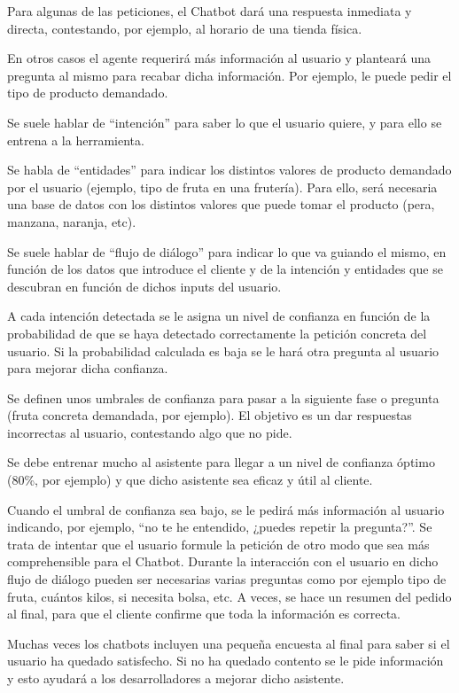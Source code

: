 Para algunas de las peticiones, el Chatbot dará una respuesta inmediata y directa, contestando, por ejemplo, al horario de una tienda física.

En otros casos el agente requerirá más información al usuario y planteará una pregunta al mismo para recabar dicha información. Por ejemplo, le puede pedir el tipo de producto demandado.

Se suele hablar de “intención” para saber lo que el usuario quiere, y para ello se entrena a la herramienta.

Se habla de “entidades” para indicar los distintos valores de producto demandado por el usuario (ejemplo, tipo de fruta en una frutería). Para ello, será necesaria una base de datos con los distintos valores que puede tomar el producto (pera, manzana, naranja, etc).

Se suele hablar de “flujo de diálogo” para indicar lo que va guiando el mismo, en función de los datos que introduce el cliente y de la intención y entidades que se descubran en función de dichos inputs del usuario.

A cada intención detectada se le asigna un nivel de confianza en función de la probabilidad de que se haya detectado correctamente la petición concreta del usuario. Si la probabilidad calculada es baja se le hará otra pregunta al usuario para mejorar dicha confianza.

Se definen unos umbrales de confianza para pasar a la siguiente fase o pregunta (fruta concreta demandada, por ejemplo). El objetivo es un dar respuestas incorrectas al usuario, contestando algo que no pide. 

Se debe entrenar mucho al asistente para llegar a un nivel de confianza óptimo (80\%, por ejemplo) y que dicho asistente sea eficaz y útil al cliente.

Cuando el umbral de confianza sea bajo, se le pedirá más información al usuario indicando, por ejemplo, “no te he entendido, ¿puedes repetir la pregunta?”. Se trata de intentar que el usuario formule la petición de otro modo que sea más comprehensible para el Chatbot.
Durante la interacción con el usuario en dicho flujo de diálogo pueden ser necesarias varias preguntas como por ejemplo tipo de fruta, cuántos kilos, si necesita bolsa, etc. A veces, se hace un resumen del pedido al final, para que el cliente confirme que toda la información es correcta. 

Muchas veces los chatbots incluyen una pequeña encuesta al final para saber si el usuario ha quedado satisfecho. Si no ha quedado contento se le pide información y esto ayudará a los desarrolladores a mejorar dicho asistente.


